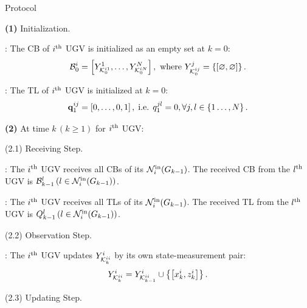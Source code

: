 	\begin{algorithm}
		\caption{{\proto} Protocol}
		\label{alg:lifo}
		\begin{algorithmic}
			\State \textbf{(1)} Initialization.
			
			\CB: 
			The CB of $i^\text{th}$ UGV is initialized as an empty set at $k=0$:
			\small\begin{equation*}
			{\mathcal{B}^i_0=\left[ Y^1_{\mathcal{K}^{i1}_{0}},\dots,Y^N_{\mathcal{K}^{iN}_{0}}\right], \text{ where } Y^j_{\mathcal{K}^{ij}_0} = \left\lbrace\left[ \varnothing,\varnothing\right]\right\rbrace.}
			\end{equation*}\normalsize
			
			\TL:
			The TL of $i^\text{th}$ UGV is initialized at $k=0$:
			\small\begin{equation*}
			\mathbf{q}^{ij}_1 = \left[0,\dots,0,1\right],\;\text{i.e. } q^{jl}_1=0, \forall j,l\in \left\lbrace 1\dots,N\right\rbrace.
			\end{equation*}\normalsize
			
			\State \textbf{(2)} At time $k\,(k\geq 1)$ for $i^\text{th}$ UGV:	
			
			\State (2.1) Receiving Step.
			
			\CB:	The $i^\text{th}$ UGV receives all CBs of its {\inbhd} $\mathcal{N}^\text{in}_i(G_{k-1})$.
			The received CB from the $l^\text{th}$ UGV is $\mathcal{B}^l_{k-1}\,(l\in\mathcal{N}^\text{in}_i(G_{k-1}))$.
			
			\TL: The $i^\text{th}$ UGV receives all TLs of its {\inbhd} $\mathcal{N}^\text{in}_i(G_{k-1})$.
			The received TL from the $l^\text{th}$ UGV is $Q^l_{k-1}\,(l\in\mathcal{N}^\text{in}_i(G_{k-1}))$.
			\newline
			
			\State (2.2) Observation Step.
			
			\CB: The $i^\text{th}$ UGV updates $Y^i_{\mathcal{K}^{ii}_{k}}$ by its own state-measurement pair: %
			\small\begin{equation*}
			Y^i_{\mathcal{K}^{ii}_{k}} = Y^i_{\mathcal{K}^{ii}_{k-1}} \cup \left\lbrace{\left[x^i_k,z^i_k\right]}\right\rbrace.
			\end{equation*}\normalsize
			
			\State (2.3) Updating Step.
			

\end{algorithmic}
\end{algorithm}
